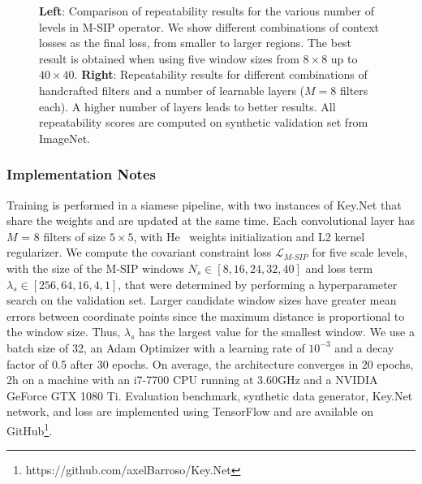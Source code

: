 \begin{figure}[ht]
\begin{minipage}[b]{.57\textwidth}
    \vspace{-2.45cm}
\end{minipage}
\vspace{-0.25cm}
\caption{\textbf{Left}: Comparison of repeatability results for the various number of levels in M-SIP operator. We show different combinations of context losses as the final loss,  from smaller to larger regions. The best result is obtained when using five window sizes from $8\times 8$ up to $40\times 40$. \textbf{Right}: Repeatability results for different combinations of handcrafted filters and a number of learnable layers ($M=8$ filters each). A higher number of layers leads to better results. All repeatability scores are computed on synthetic validation set from ImageNet.}
\label{table:context_losses_and_learnableblocks}
\end{figure}



\subsubsection{Implementation Notes}
\label{subsec:Implementation_Details}
Training is performed in a siamese pipeline, with two instances of Key.Net that share the weights and are updated at the same time.
Each convolutional layer has $M$ = 8 filters of size $5 \times 5$, with He~\cite{HE_initializatio} weights initialization and L2 kernel regularizer. 
We compute the covariant constraint loss $\mathcal{L}_{M\mbox{-}SIP}$ for five scale levels, with the size of the M-SIP windows $N_s \in [8, 16, 24, 32, 40]$ and loss term $\lambda_s \in [256, 64, 16, 4, 1]$, that were determined by performing a hyperparameter search on the validation set. Larger candidate window sizes have greater mean errors between coordinate points since the maximum distance is proportional to the window size. Thus, $\lambda_s$ has the largest value for the smallest window. We use a batch size of 32, an Adam Optimizer with a learning rate of $10^{-3}$ and a decay factor of 0.5 after 30 epochs. On average, the architecture converges in 20 epochs, 2h on a machine with an i7-7700 CPU running at 3.60GHz and a NVIDIA GeForce GTX 1080 Ti. Evaluation benchmark, synthetic data generator, Key.Net network, and loss are implemented using TensorFlow and are available on GitHub\footnote{https://github.com/axelBarroso/Key.Net}. 


